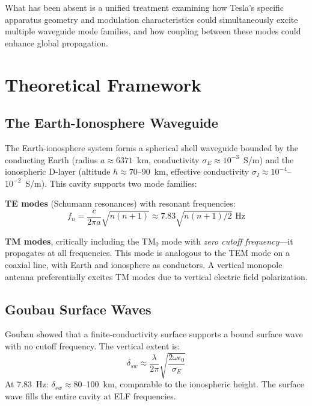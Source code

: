 \documentclass[12pt,a4paper]{article}
\begin{document}
What has been absent is a unified treatment examining how Tesla's specific apparatus geometry and modulation characteristics could simultaneously excite multiple waveguide mode families, and how coupling between these modes could enhance global propagation.

\section{Theoretical Framework}

\subsection{The Earth-Ionosphere Waveguide}

The Earth-ionosphere system forms a spherical shell waveguide bounded by the conducting Earth (radius $a \approx 6371$~km, conductivity $\sigma_E \approx 10^{-3}$~S/m) and the ionospheric D-layer (altitude $h \approx 70$--90~km, effective conductivity $\sigma_I \approx 10^{-4}$--$10^{-2}$~S/m). This cavity supports two mode families:

\textbf{TE modes} (Schumann resonances) with resonant frequencies:
\begin{equation}
    f_n = \frac{c}{2\pi a}\sqrt{n(n+1)} \approx 7.83\sqrt{n(n+1)/2} \text{~Hz}
    \label{eq:schumann}
\end{equation}

\textbf{TM modes}, critically including the TM$_0$ mode with \emph{zero cutoff frequency}---it propagates at all frequencies. This mode is analogous to the TEM mode on a coaxial line, with Earth and ionosphere as conductors. A vertical monopole antenna preferentially excites TM modes due to vertical electric field polarization.

\subsection{Goubau Surface Waves}

Goubau \citep{goubau1950} showed that a finite-conductivity surface supports a bound surface wave with no cutoff frequency. The vertical extent is:
\begin{equation}
    \delta_{sw} \approx \frac{\lambda}{2\pi}\sqrt{\frac{2\omega\epsilon_0}{\sigma_E}}
    \label{eq:skin}
\end{equation}
At 7.83~Hz: $\delta_{sw} \approx 80$--100~km, comparable to the ionospheric height. The surface wave fills the entire cavity at ELF frequencies.
\end{document}
